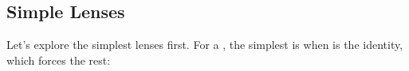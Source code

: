 \documentclass[sigplan,review,anonymous]{acmart}
\begin{document}
\subsection{Simple Lenses}
Let's explore the simplest lenses first.  For a , the simplest is
when  is the identity, which forces the rest:

\begin{code}%
\>[0]\AgdaSpace{}%
\AgdaModule{\AgdaUnderscore{}}\AgdaSpace{}%
\AgdaSymbol{(}\AgdaSpace{}%
\AgdaSpace{}%
\AgdaSpace{}%
\AgdaSpace{}%
\AgdaSymbol{:}\AgdaSpace{}%
\AgdaSymbol{)}\AgdaSpace{}%
\<%
\\
\>[0][@{}l@{\AgdaIndent{0}}]%
\>[2]\AgdaSpace{}%
\<%
\\
%
\\[\AgdaEmptyExtraSkip]%
%
\>[2]\AgdaSpace{}%
\AgdaSymbol{:}\AgdaSpace{}%
\AgdaSpace{}%
\AgdaSpace{}%
\<%
\\
%
\>[2]\AgdaSpace{}%
\AgdaSymbol{=}\AgdaSpace{}%
\AgdaSpace{}%
\AgdaSymbol{\{}\AgdaSpace{}%
\AgdaSpace{}%
\AgdaSymbol{=}\AgdaSpace{}%
\AgdaSpace{}%
\AgdaSymbol{;}\AgdaSpace{}%
\AgdaSpace{}%
\AgdaSymbol{=}\AgdaSpace{}%
\AgdaSpace{}%
\AgdaBound{\AgdaUnderscore{}}\AgdaSpace{}%
\AgdaSpace{}%
\<%
\\
\>[2][@{}l@{\AgdaIndent{0}}]%
\>[4]\AgdaSymbol{;}\AgdaSpace{}%
\AgdaSpace{}%
\AgdaSymbol{=}\AgdaSpace{}%
\AgdaSpace{}%
\AgdaBound{\AgdaUnderscore{}}\AgdaSpace{}%
\AgdaBound{\AgdaUnderscore{}}\AgdaSpace{}%
\AgdaSpace{}%
\AgdaSpace{}%
\AgdaSymbol{;}\AgdaSpace{}%
\AgdaSpace{}%
\AgdaSymbol{=}\AgdaSpace{}%
\AgdaSpace{}%
\AgdaBound{\AgdaUnderscore{}}\AgdaSpace{}%
\AgdaSpace{}%
\AgdaSpace{}%
\AgdaSymbol{;}\AgdaSpace{}%
\AgdaSpace{}%
\AgdaSymbol{=}\AgdaSpace{}%
\AgdaSpace{}%
\AgdaBound{\AgdaUnderscore{}}\AgdaSpace{}%
\AgdaBound{\AgdaUnderscore{}}\AgdaSpace{}%
\AgdaBound{\AgdaUnderscore{}}\AgdaSpace{}%
\AgdaSpace{}%
\AgdaSpace{}%
\AgdaSymbol{\}}\<%
\end{code}
\end{document}
